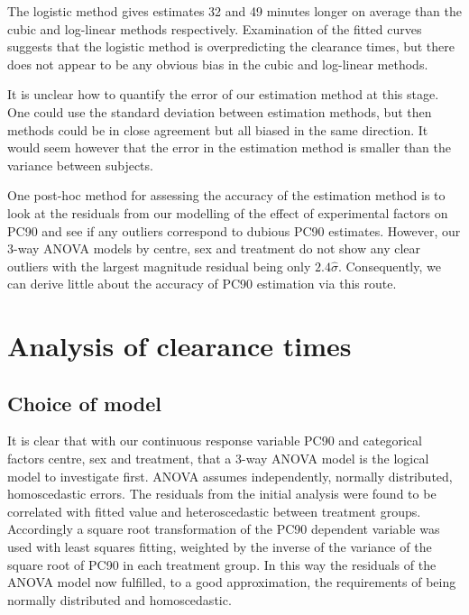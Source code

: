 The logistic method gives estimates 32 and 49 minutes longer on average than the cubic and log-linear methods respectively. Examination of the fitted curves suggests that the logistic method is overpredicting the clearance times, but there does not appear to be any obvious bias in the cubic and log-linear methods.

It is unclear how to quantify the error of our estimation method at this stage. One could use the standard deviation between estimation methods, but then methods could be in close agreement but all biased in the same direction. It would seem however that the error in the estimation method is smaller than the variance between subjects. 

One post-hoc method for assessing the accuracy of the estimation method is to look at the residuals from our modelling of the effect of experimental factors on PC90 and see if any outliers correspond to dubious PC90 estimates. However, our 3-way ANOVA models by centre, sex and treatment do not show any clear outliers with the largest magnitude residual being only $2.4\hat{\sigma}$. Consequently, we can derive little about the accuracy of PC90 estimation via this route.

\section{Analysis of clearance times}
\subsection{Choice of model}
It is clear that with our continuous response variable PC90 and categorical factors centre, sex and treatment, that a 3-way ANOVA model is the logical model to investigate first. ANOVA assumes independently, normally distributed, homoscedastic 
errors. The residuals from the initial analysis were found to be correlated with fitted value and heteroscedastic between treatment groups. Accordingly a square root transformation of the PC90 dependent variable was used with least squares fitting, weighted by the inverse of the variance of the square root of PC90 in each treatment group. In this way the residuals of the ANOVA model now fulfilled, to a good approximation, the requirements of being normally distributed and homoscedastic.

